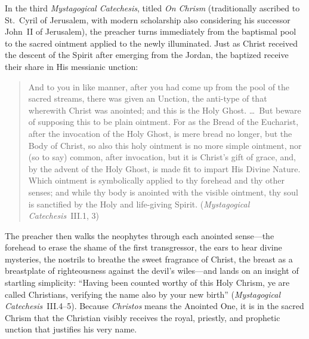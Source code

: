 In the third \emph{Mystagogical Catechesis}, titled \emph{On Chrism} (traditionally ascribed to St.~Cyril of Jerusalem, with modern scholarship also considering his successor John~II of Jerusalem), the preacher turns immediately from the baptismal pool to the sacred ointment applied to the newly illuminated. Just as Christ received the descent of the Spirit after emerging from the Jordan, the baptized receive their share in His messianic unction:
\begin{quotation}
And to you in like manner, after you had come up from the pool of the sacred streams, there was given an Unction, the anti-type of that wherewith Christ was anointed; and this is the Holy Ghost. \dots\ But beware of supposing this to be plain ointment. For as the Bread of the Eucharist, after the invocation of the Holy Ghost, is mere bread no longer, but the Body of Christ, so also this holy ointment is no more simple ointment, nor (so to say) common, after invocation, but it is Christ's gift of grace, and, by the advent of the Holy Ghost, is made fit to impart His Divine Nature. Which ointment is symbolically applied to thy forehead and thy other senses; and while thy body is anointed with the visible ointment, thy soul is sanctified by the Holy and life-giving Spirit. (\emph{Mystagogical Catechesis}~III.1, 3)
\end{quotation}
The preacher then walks the neophytes through each anointed sense---the forehead to erase the shame of the first transgressor, the ears to hear divine mysteries, the nostrils to breathe the sweet fragrance of Christ, the breast as a breastplate of righteousness against the devil's wiles---and lands on an insight of startling simplicity: ``Having been counted worthy of this Holy Chrism, ye are called Christians, verifying the name also by your new birth'' (\emph{Mystagogical Catechesis}~III.4--5). Because \emph{Christos} means the Anointed One, it is in the sacred Chrism that the Christian visibly receives the royal, priestly, and prophetic unction that justifies his very name.

